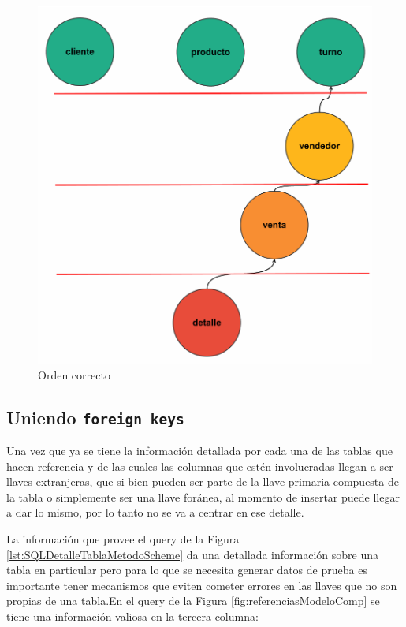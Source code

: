 \begin{figure}[H]
 \centering
 \includegraphics[scale=0.2]{images/ordenadocomp.png}
 \caption{Orden correcto}
 \label{ordencorrectonodos}
 \end{figure}
  
\subsection{Uniendo \texttt{foreign keys}}
Una vez que ya se tiene la informaci\'on detallada por cada una de las tablas que hacen referencia y de las cuales las columnas que est\'en involucradas llegan a ser llaves extranjeras, que si bien pueden ser parte de la llave primaria compuesta de la tabla o simplemente ser una llave for\'anea, al momento de insertar puede llegar a dar lo mismo, por lo tanto no se va a centrar en ese detalle.

La informaci\'on que provee el query de la Figura \ref{lst:SQLDetalleTablaMetodoScheme} da una detallada informaci\'on sobre una tabla en particular pero para lo que se necesita generar datos de prueba es importante tener mecanismos que eviten cometer errores en las llaves que no son propias de una tabla.En el query de la Figura \ref{fig:referenciasModeloComp} se tiene una informaci\'on valiosa en la tercera columna:

